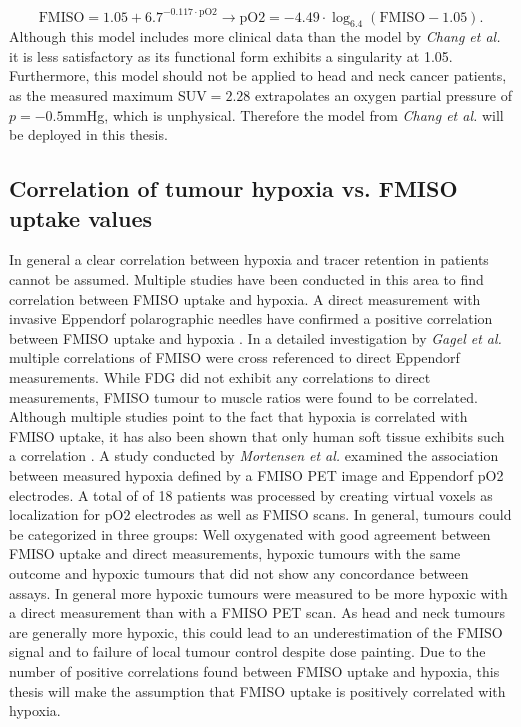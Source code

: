\begin{equation}
\mathrm{FMISO} = 1.05 + 6.7^{-0.117\cdot \mathrm{pO2}}\rightarrow \mathrm{pO2} = -4.49\cdot \log_{6.4}(\mathrm{FMISO - 1.05}).
\end{equation}
Although this model includes more clinical data than the model by \textit{Chang et al.} \cite{pmid19994538} it is less satisfactory as its functional form exhibits a singularity at 1.05. Furthermore, this model should not be applied to head and neck cancer patients, as the measured maximum SUV$= 2.28$ extrapolates an oxygen partial pressure of $p=-0.5$mmHg, which is unphysical. Therefore the model from \textit{Chang et al.}\cite{pmid19994538} will be deployed in this thesis.
\subsection{Correlation of tumour hypoxia vs. FMISO uptake values}\label{chap:hypoxiacorrelation}
In general a clear correlation between hypoxia and tracer retention in patients cannot be assumed. Multiple studies have been conducted in this area to find correlation between FMISO uptake and hypoxia. A direct measurement with invasive Eppendorf polarographic needles have confirmed a positive correlation between FMISO uptake and hypoxia \cite{pmid16104907, pmid16841141, pmid17598907, pmid15480509, pmid8892467}. In a detailed investigation by \textit{Gagel et al.} \cite{pmid17598907} multiple correlations of FMISO were cross referenced to direct Eppendorf measurements. While FDG did not exhibit any correlations to direct measurements, FMISO tumour to muscle ratios were found to be correlated. Although multiple studies point to the fact that hypoxia is correlated with FMISO uptake, it has also been shown that only human soft tissue exhibits such a correlation \cite{pmid12865184}. A study conducted by \textit{Mortensen et al.} \cite{pmid20831480} examined the association between measured hypoxia defined by a FMISO PET image and Eppendorf pO2 electrodes.  A total of of 18 patients was processed by creating virtual voxels as localization for pO2 electrodes as well as FMISO scans. In general, tumours could be categorized in three groups: Well oxygenated with good agreement between FMISO uptake and direct measurements, hypoxic tumours with the same outcome and hypoxic tumours that did not show any concordance between assays. In general more hypoxic tumours were measured to be more hypoxic with a direct measurement than with a FMISO PET scan. As head and neck tumours are generally more hypoxic, this could lead to an underestimation of the FMISO signal and to failure of local tumour control  despite dose painting. Due to the number of positive correlations found between FMISO uptake and hypoxia, this thesis will make the assumption that FMISO uptake is positively correlated with hypoxia.
